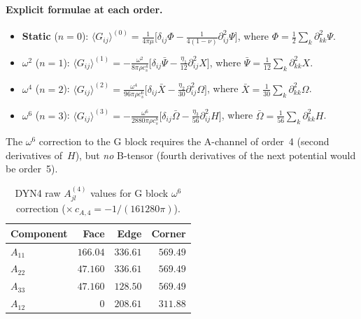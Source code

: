 \documentclass[11pt,a4paper]{article}
\theoremstyle{plain}
\theoremstyle{remark}
\begin{document}
\paragraph{Explicit formulae at each order.}
\begin{itemize}[nosep]
\item \textbf{Static} ($n=0$):
  $\langle G_{ij}\rangle^{(0)} =
  \frac{1}{4\pi\mu}\bigl[\delta_{ij}\Phi
  - \frac{1}{4(1-\nu)}\partial^2_{ij}\Psi\bigr]$,
  where $\Phi = \tfrac{1}{2}\sum_k\partial^2_{kk}\Psi$.

\item \textbf{$\omega^2$} ($n=1$):
  $\langle G_{ij}\rangle^{(1)} =
  -\frac{\omega^2}{8\pi\rho c_s^4}\bigl[\delta_{ij}\bar\Psi
  - \frac{\eta_1}{12}\partial^2_{ij}X\bigr]$,
  where $\bar\Psi = \tfrac{1}{12}\sum_k\partial^2_{kk}X$.

\item \textbf{$\omega^4$} ($n=2$):
  $\langle G_{ij}\rangle^{(2)} =
  \frac{\omega^4}{96\pi\rho c_s^6}\bigl[\delta_{ij}\bar X
  - \frac{\eta_2}{30}\partial^2_{ij}\Omega\bigr]$,
  where $\bar X = \tfrac{1}{30}\sum_k\partial^2_{kk}\Omega$.

\item \textbf{$\omega^6$} ($n=3$):
  $\langle G_{ij}\rangle^{(3)} =
  -\frac{\omega^6}{2880\pi\rho c_s^8}\bigl[\delta_{ij}\bar\Omega
  - \frac{\eta_3}{56}\partial^2_{ij}H\bigr]$,
  where $\bar\Omega = \tfrac{1}{56}\sum_k\partial^2_{kk}H$.
\end{itemize}

The $\omega^6$ correction to the G block requires the A-channel
of order~4 (second derivatives of~$H$), but \emph{no} B-tensor
(fourth derivatives of the next potential would be order~5).

\begin{table}[ht]
\centering
\caption{DYN4 raw $A^{(4)}_{jl}$ values for G block $\omega^6$ correction
($\times\, c_{A,4} = -1/(161280\pi)$).}
\label{tab:dyn4-A}
\begin{tabular}{l*{3}{r}}
\toprule
Component & Face & Edge & Corner \\
\midrule
$A_{11}$ & $166.04$ & $336.61$ & $569.49$ \\
$A_{22}$ & $47.160$ & $336.61$ & $569.49$ \\
$A_{33}$ & $47.160$ & $128.50$ & $569.49$ \\
$A_{12}$ & $0$ & $208.61$ & $311.88$ \\
\bottomrule
\end{tabular}
\end{table}
\end{document}
